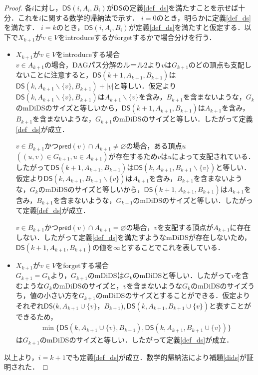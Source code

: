 \documentclass[master]{kuisthesis}		%
\theoremstyle{plain}
\theoremstyle{definition}
\begin{document}
\begin{proof}
    各$i$に対し，$\mathsf{DS}(i, A_i, B_i)$が$\mathsf{DS}$の定義\ref{def_ds}を満たすことを示せば十分．これを$i$に関する数学的帰納法で示す．
    $i=0$のとき，明らかに定義\ref{def_ds}を満たす．
    $i=k$のとき，$\mathsf{DS}(i, A_i, B_i)$が定義\ref{def_ds}を満たすと仮定する．以下で$X_{k+1}$が$v \in V$をintroduceするかforgetするかで場合分けを行う．
    \begin{itemize}
        \item $X_{k+1}$が$v \in V$をintroduceする場合 \\
        $v \in A_{k+1}$の場合，DAGパス分解のルール2より$v$は$G_{k+1}$のどの頂点も支配しないことに注意すると，$\mathsf{DS}(k+1, A_{k+1}, B_{k+1})$は$\mathsf{DS}(k, A_{k+1} \backslash \{v\}, B_{k+1}) + |{v}|$と等しい．仮定より$\mathsf{DS}(k, A_{k+1} \backslash \{v\}, B_{k+1})$は$A_{k+1} \backslash \{v\}$を含み，$B_{k+1}$を含まないような，$G_k$のmDiDSのサイズと等しいから，$\mathsf{DS}(k+1, A_{k+1}, B_{k+1})$は$A_{k+1}$を含み，$B_{k+1}$を含まないような，$G_{k+1}$のmDiDSのサイズと等しい．したがって定義\ref{def_ds}が成立．
        
        $v \in B_{k+1}$かつ$\mathsf{pred}(v) \cap A_{k+1} \neq \varnothing$の場合，ある頂点$u$ $((u, v) \in G_{k+1}, u \in A_{k+1})$が存在するため$v$は$u$によって支配されている．したがって$\mathsf{DS}(k+1, A_{k+1}, B_{k+1})$は$\mathsf{DS}(k, A_{k+1}, B_{k+1} \backslash \{v\})$と等しい．仮定より$\mathsf{DS}(k, A_{k+1}, B_{k+1} \backslash \{v\})$は$A_{k+1}$を含み，$B_{k+1}$を含まないような，$G_k$のmDiDSのサイズと等しいから，$\mathsf{DS}(k+1, A_{k+1}, B_{k+1})$は$A_{k+1}$を含み，$B_{k+1}$を含まないような，$G_{k+1}$のmDiDSのサイズと等しい．したがって定義\ref{def_ds}が成立．

        $v \in B_{k+1}$かつ$\mathsf{pred}(v) \cap A_{k+1} = \varnothing$の場合，$v$を支配する頂点が$A_{k+1}$に存在しない．したがって定義\ref{def_ds}を満たすようなmDiDSが存在しないため，$\mathsf{DS}(k+1, A_{k+1}, B_{k+1})$の値を$\infty$とすることでこれを表している．
        
        \item $X_{k+1}$が$v \in V$をforgetする場合 \\
        $G_{k+1} = G_k$より，$G_{k+1}$のmDiDSは$G_k$のmDiDSと等しい．したがって$v$を含むような$G_k$のmDiDSのサイズと，$v$を含まないような$G_k$のmDiDSのサイズうち，値の小さい方を$G_{k+1}$のmDiDSのサイズとすることができる．仮定よりそれぞれ$\mathsf{DS}(k, A_{k+1} \cup \{v\}$，$B_{k+1}), \mathsf{DS}(k, A_{k+1}, B_{k+1} \cup \{v\})$と表すことができるため，
        \begin{align*}
            \min \{\mathsf{DS}(k, A_{k+1} \cup \{v\}, B_{k+1}), \mathsf{DS}(k, A_{k+1}, B_{k+1} \cup \{v\})\}
        \end{align*}
        は$G_{k+1}$のmDiDSのサイズと等しい．したがって定義\ref{def_ds}が成立．
    \end{itemize}
    以上より，$i = k+1$でも定義\ref{def_ds}が成立．数学的帰納法により補題\ref{dids}が証明された．
\end{proof}
\end{document}
